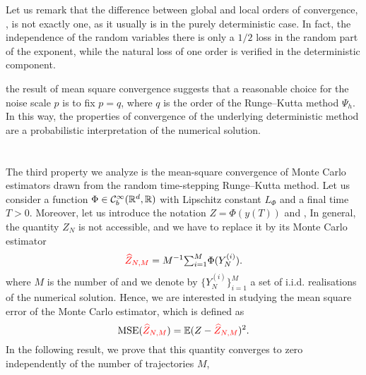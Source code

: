 \documentclass[10pt]{article}
\begin{document}
\begin{remark} Let us remark that the difference between global and local orders of convergence, , is not exactly one, as it usually is in the purely deterministic case. In fact,  the independence of the random variables there is only a $1/2$ loss in the random part of the exponent, while the natural loss of one order is verified in the deterministic component.
\end{remark}
\begin{remark}  the result of mean square convergence suggests that a reasonable choice for the noise scale $p$ is to fix $p=q$, where $q$ is the order of the Runge--Kutta method $\Psi_h$. In this way, the properties of convergence of the underlying deterministic method are  a probabilistic interpretation of the numerical solution.
\end{remark}

\section{}\label{sec:MonteCarlo}

The third property we analyze is the mean-square convergence of Monte Carlo estimators drawn from the random time-stepping Runge--Kutta method. Let us consider a function $\Phi\in\mathcal{C}^\infty_b(\mathbb{R}^d, \mathbb{R})$ with Lipschitz constant $L_\Phi$ and a final time $T > 0$. Moreover, let us introduce the notation $Z = \Phi(y(T))$ and ,  In general, the quantity $Z_N$ is not accessible, and we have to replace it by its Monte Carlo estimator 
\begin{equation}\label{eq:MSE}
	{\color{red}\widehat Z_{N, M}} = M^{-1} {\textstyle\sum}_{i = 1}^M \Phi(Y_N^{(i)}).
\end{equation}
where $M$ is the number of  and we denote by $\{Y_N^{(i)}\}_{i=1}^M$ a set of i.i.d. realisations of the numerical solution. Hence, we are interested in studying the mean square error of the Monte Carlo estimator, which is defined as
\begin{equation}
	\operatorname{MSE}({\color{red}\widehat Z_{N, M}}) = \operatorname{\mathbb{E}}(Z - {\color{red}\widehat Z_{N, M}})^2.
\end{equation}
In the following result, we prove that this quantity converges to zero independently of the number of trajectories $M$, 
\end{document}
